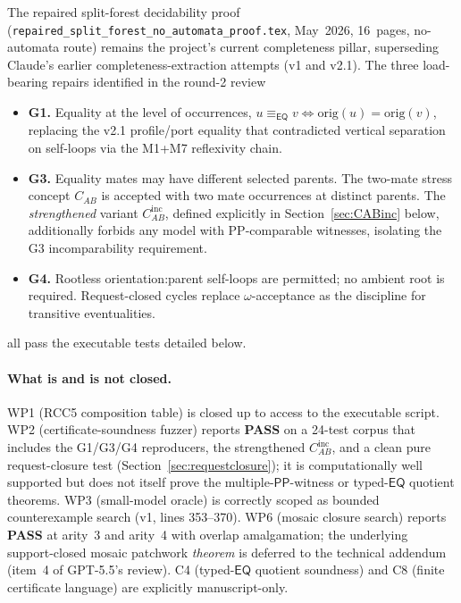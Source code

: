 \documentclass[11pt]{article}
\newcommand{\EQ}{\mathsf{EQ}}
\newcommand{\PP}{\mathsf{PP}}
\newcommand{\eqrel}{\equiv_{\EQ}}
\newcommand{\PASS}{\textcolor{black!70!green}{\textbf{PASS}}}
\begin{document}
The repaired split-forest decidability proof
(\texttt{repaired\_split\_forest\_no\_automata\_proof.tex},
May~2026, 16~pages, no-automata route) remains the project's
current completeness pillar, superseding Claude's earlier
completeness-extraction attempts (v1 and v2.1).  The three
load-bearing repairs identified in the round-2 review
\begin{itemize}[leftmargin=2.2em]
  \item \textbf{G1.}  Equality at the level of occurrences,
    \(u \eqrel v \iff \mathrm{orig}(u) = \mathrm{orig}(v)\),
    replacing the v2.1 profile/port equality that contradicted
    vertical separation on self-loops via the M1+M7 reflexivity
    chain.
  \item \textbf{G3.}  Equality mates may have different selected
    parents.  The two-mate stress concept \(C_{AB}\) is accepted
    with two mate occurrences at distinct parents.  The
    \emph{strengthened} variant \(C_{AB}^{\mathrm{inc}}\), defined
    explicitly in Section~\ref{sec:CABinc} below, additionally
    forbids any model with PP-comparable witnesses, isolating the
    G3 incomparability requirement.
  \item \textbf{G4.}  Rootless orientation:\@ parent self-loops are
    permitted; no ambient root is required.  Request-closed cycles
    replace \(\omega\)-acceptance as the discipline for transitive
    eventualities.
\end{itemize}
all pass the executable tests detailed below.

\paragraph{What is and is not closed.}  WP1 (RCC5 composition
table) is closed up to access to the executable script.  WP2
(certificate-soundness fuzzer) reports \PASS{} on a 24-test corpus
that includes the G1/G3/G4 reproducers, the strengthened
\(C_{AB}^{\mathrm{inc}}\), and a clean pure request-closure test
(Section~\ref{sec:requestclosure}); it is computationally well
supported but does not itself prove the multiple-\(\PP\)-witness or
typed-\(\EQ\) quotient theorems.  WP3 (small-model oracle) is
correctly scoped as bounded counterexample search (v1, lines
353--370).  WP6 (mosaic closure search) reports \PASS{} at arity~3
and arity~4 with overlap amalgamation; the underlying support-closed
mosaic patchwork \emph{theorem} is deferred to the technical
addendum (item~4 of GPT-5.5's review).  C4 (typed-\(\EQ\) quotient
soundness) and C8 (finite certificate language) are explicitly
manuscript-only.
\end{document}

